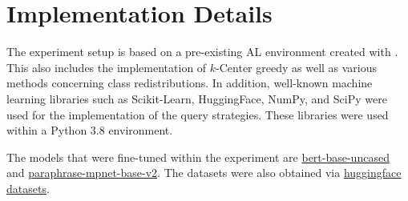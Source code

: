 \documentclass[english,bachelor,ul]{webisthesis} %
\begin{document}

%
%

%

\appendix
\chapter{Implementation Details}

The experiment setup is based on a pre-existing AL environment created with \cite{schroeder2023small-text}. This also includes the implementation of $k$-Center greedy as well as various methods concerning class redistributions. In addition, well-known machine learning libraries such as Scikit-Learn, HuggingFace, NumPy, and SciPy were used for the implementation of the query strategies. These libraries were used within a Python 3.8 environment.

The models that were fine-tuned within the experiment are \href{https://huggingface.co/google-bert/bert-base-uncased}{bert-base-uncased} and \href{https://huggingface.co/sentence-transformers/paraphrase-mpnet-base-v2}{
paraphrase-mpnet-base-v2}. The datasets were also obtained via \href{https://github.com/huggingface/datasets}{huggingface datasets}.

\end{document}
